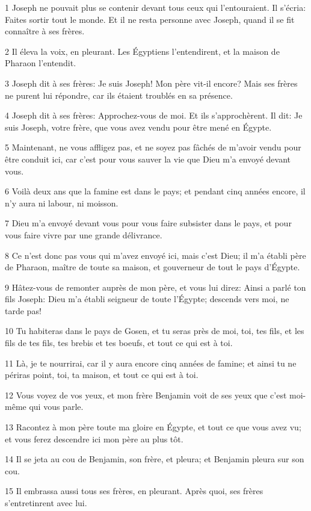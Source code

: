 \par 1 Joseph ne pouvait plus se contenir devant tous ceux qui l'entouraient. Il s'écria: Faites sortir tout le monde. Et il ne resta personne avec Joseph, quand il se fit connaître à ses frères.
\par 2 Il éleva la voix, en pleurant. Les Égyptiens l'entendirent, et la maison de Pharaon l'entendit.
\par 3 Joseph dit à ses frères: Je suis Joseph! Mon père vit-il encore? Mais ses frères ne purent lui répondre, car ils étaient troublés en sa présence.
\par 4 Joseph dit à ses frères: Approchez-vous de moi. Et ils s'approchèrent. Il dit: Je suis Joseph, votre frère, que vous avez vendu pour être mené en Égypte.
\par 5 Maintenant, ne vous affligez pas, et ne soyez pas fâchés de m'avoir vendu pour être conduit ici, car c'est pour vous sauver la vie que Dieu m'a envoyé devant vous.
\par 6 Voilà deux ans que la famine est dans le pays; et pendant cinq années encore, il n'y aura ni labour, ni moisson.
\par 7 Dieu m'a envoyé devant vous pour vous faire subsister dans le pays, et pour vous faire vivre par une grande délivrance.
\par 8 Ce n'est donc pas vous qui m'avez envoyé ici, mais c'est Dieu; il m'a établi père de Pharaon, maître de toute sa maison, et gouverneur de tout le pays d'Égypte.
\par 9 Hâtez-vous de remonter auprès de mon père, et vous lui direz: Ainsi a parlé ton fils Joseph: Dieu m'a établi seigneur de toute l'Égypte; descends vers moi, ne tarde pas!
\par 10 Tu habiteras dans le pays de Gosen, et tu seras près de moi, toi, tes fils, et les fils de tes fils, tes brebis et tes boeufs, et tout ce qui est à toi.
\par 11 Là, je te nourrirai, car il y aura encore cinq années de famine; et ainsi tu ne périras point, toi, ta maison, et tout ce qui est à toi.
\par 12 Vous voyez de vos yeux, et mon frère Benjamin voit de ses yeux que c'est moi-même qui vous parle.
\par 13 Racontez à mon père toute ma gloire en Égypte, et tout ce que vous avez vu; et vous ferez descendre ici mon père au plus tôt.
\par 14 Il se jeta au cou de Benjamin, son frère, et pleura; et Benjamin pleura sur son cou.
\par 15 Il embrassa aussi tous ses frères, en pleurant. Après quoi, ses frères s'entretinrent avec lui.

